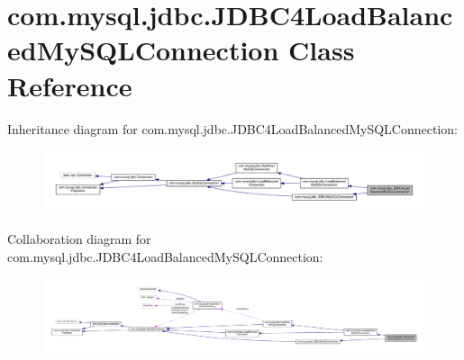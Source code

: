 \hypertarget{classcom_1_1mysql_1_1jdbc_1_1_j_d_b_c4_load_balanced_my_s_q_l_connection}{}\section{com.\+mysql.\+jdbc.\+J\+D\+B\+C4\+Load\+Balanced\+My\+S\+Q\+L\+Connection Class Reference}
\label{classcom_1_1mysql_1_1jdbc_1_1_j_d_b_c4_load_balanced_my_s_q_l_connection}


Inheritance diagram for com.\+mysql.\+jdbc.\+J\+D\+B\+C4\+Load\+Balanced\+My\+S\+Q\+L\+Connection\+:
\nopagebreak
\begin{figure}[H]
\begin{center}
\leavevmode
\includegraphics[width=350pt]{classcom_1_1mysql_1_1jdbc_1_1_j_d_b_c4_load_balanced_my_s_q_l_connection__inherit__graph}
\end{center}
\end{figure}


Collaboration diagram for com.\+mysql.\+jdbc.\+J\+D\+B\+C4\+Load\+Balanced\+My\+S\+Q\+L\+Connection\+:
\nopagebreak
\begin{figure}[H]
\begin{center}
\leavevmode
\includegraphics[width=350pt]{classcom_1_1mysql_1_1jdbc_1_1_j_d_b_c4_load_balanced_my_s_q_l_connection__coll__graph}
\end{center}
\end{figure}
